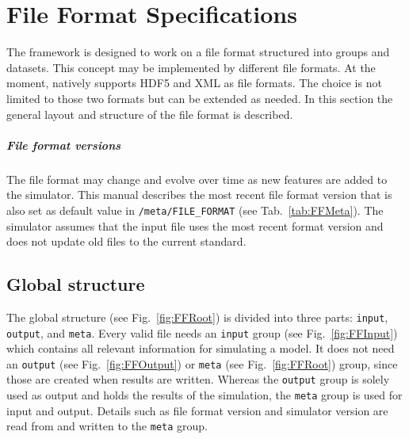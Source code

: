 %  
%  

\chapter{\CADET{} File Format Specifications}

The \CADET{} framework is designed to work on a file format structured into groups and datasets. This
concept may be implemented by different file formats.
At the moment, \CADET{} natively supports HDF5 and XML as file formats.
The choice is not limited to those two formats but can be extended as needed.
In this section the general layout and structure of the file format is described.

\paragraph{File format versions}
\label{par:FFVersions}

The file format may change and evolve over time as new features are added to the simulator.
This manual describes the most recent file format version that is also set as default value in \texttt{/meta/FILE\_FORMAT} (see Tab.~\ref{tab:FFMeta}).
The simulator assumes that the input file uses the most recent format version and does not update old files to the current standard.

\section{Global structure}

The global structure (see Fig.~\ref{fig:FFRoot}) is divided into three parts: \texttt{input}, \texttt{output}, and \texttt{meta}.
Every valid \CADET{} file needs an \texttt{input} group (see Fig.~\ref{fig:FFInput}) which contains all relevant information for simulating a model.
It does not need an \texttt{output} (see Fig.~\ref{fig:FFOutput}) or \texttt{meta} (see Fig.~\ref{fig:FFRoot}) group, since those are created when results are written.
Whereas the \texttt{output} group is solely used as output and holds the results of the simulation, the \texttt{meta} group is used for input and output.
Details such as file format version and simulator version are read from and written to the \texttt{meta} group.

